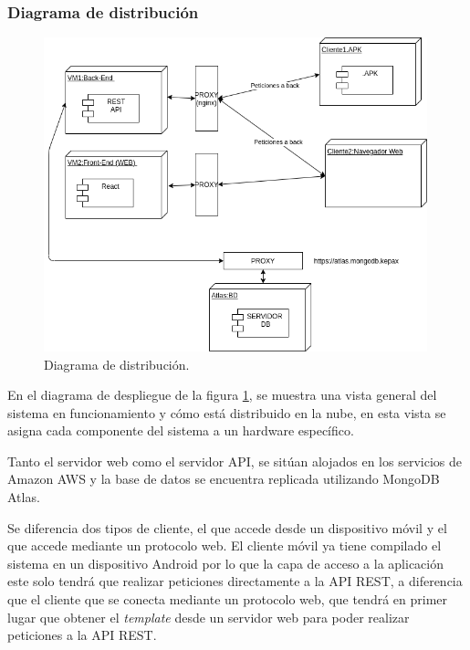 \documentclass{article}
\begin{document}
 
\subsubsection*{Diagrama de distribución}
 
\begin{figure}[H]
   \centering
       \includegraphics[width=0.99\textwidth]{../images/despliegue.png}
   \caption{Diagrama de distribución.}
   \label{despliegue}
\end{figure}
 
En el diagrama de despliegue de la figura \ref{despliegue}, se muestra una vista general del sistema en funcionamiento y cómo está distribuido en la nube, en esta vista se asigna cada componente del sistema a un hardware específico.
 
Tanto el servidor web como el servidor API, se sitúan alojados en los servicios de Amazon AWS y la base de datos se encuentra replicada utilizando MongoDB Atlas.
 
Se diferencia dos tipos de cliente, el que accede desde un dispositivo móvil y el que accede mediante un protocolo web. El cliente móvil ya tiene compilado el sistema en un dispositivo Android por lo que la capa de acceso a la aplicación este solo tendrá que realizar peticiones directamente a la API REST, a diferencia que el cliente que se conecta mediante un protocolo web, que tendrá en primer lugar que obtener el \textit{template} desde un servidor web para poder realizar peticiones a la API REST.
 
\end{document}
